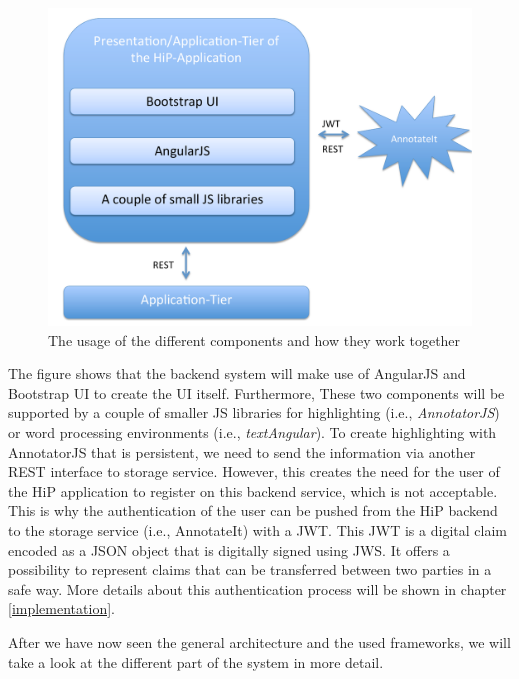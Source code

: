  \begin{figure}[th]
\centerline{\includegraphics[width=1\textwidth]{gfx/components}}
\caption{The usage of the different components and how they work together}
\label{hip:components}
\end{figure}

The figure shows that the backend system will make use of AngularJS and Bootstrap UI to create the \ac{UI} itself. Furthermore, These two components will be supported by a couple of smaller \ac{JS} libraries for highlighting (i.e., \emph{AnnotatorJS}) or word processing environments (i.e., \emph{textAngular}). To create highlighting with AnnotatorJS that is persistent, we need to send the information via another \ac{REST} interface to storage service.
However, this creates the need for the user of the \ac{HiP} application to register on this backend service, which is not acceptable. This is why the authentication of the user can be pushed from the \ac{HiP} backend to the storage service (i.e., AnnotateIt) with a \ac{JWT}. This \ac{JWT} is a digital claim encoded as a \ac{JSON} object that is digitally signed using \ac{JWS}. It offers a possibility to represent claims that can be transferred between two parties in a safe way. More details about this authentication process will be shown in chapter \ref{implementation}.

After we have now seen the general architecture and the used frameworks, we will take a look at the different part of the system in more detail.
 
